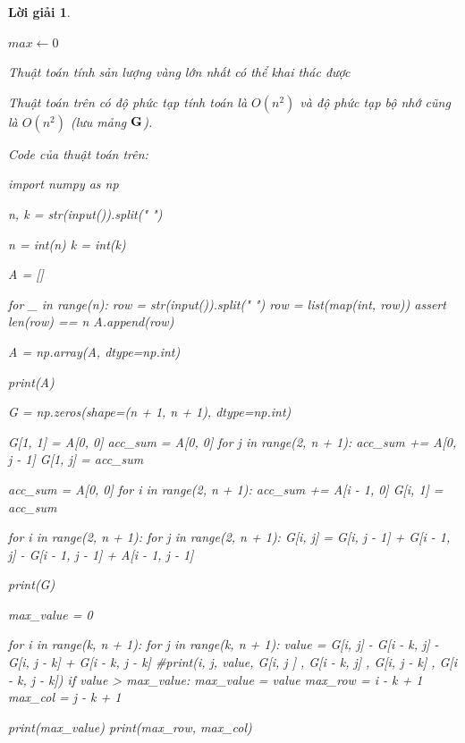 \documentclass[14pt, a4paper]{article}
\theoremstyle{sltheorem}
\theoremstyle{soltheorem}
\newtheorem*{loigiai}{Lời giải}
\begin{document}
\begin{loigiai}
\begin{itemize} [label={$-$}]
\begin{algorithm}[h!]
            $max \gets 0$\;
            \;
            \caption{Thuật toán tính sản lượng vàng lớn nhất có thể khai thác được}
        \end{algorithm}

        Thuật toán trên có độ phức tạp tính toán là $O(n^2)$ và độ phức tạp bộ nhớ cũng là $O(n^2)$ (lưu mảng $\bold{G}$).

        Code của thuật toán trên:

        \begin{python}
import numpy as np

n, k = str(input()).split(" ")
            
n = int(n)
k = int(k)
            
A = []
            
for _ in range(n):
    row = str(input()).split(" ")
    row = list(map(int, row))
    assert len(row) == n
    A.append(row)
            
A = np.array(A, dtype=np.int)
            
print(A)
            
G = np.zeros(shape=(n + 1, n + 1), dtype=np.int)
            
G[1, 1] = A[0, 0]
acc_sum = A[0, 0]
for j in range(2, n + 1):
    acc_sum += A[0, j - 1]
    G[1, j] = acc_sum
            
acc_sum = A[0, 0]
for i in range(2, n + 1):
    acc_sum += A[i - 1, 0]
    G[i, 1] = acc_sum
            
for i in range(2, n + 1):
    for j in range(2, n + 1):
        G[i, j] = G[i, j - 1] + G[i - 1, j] - G[i - 1, j - 1] + A[i - 1, j - 1]
            
            
print(G)
            
max_value = 0
            
for i in range(k, n + 1):
    for j in range(k, n + 1):
        value = G[i, j] - G[i - k, j] - G[i, j - k] + G[i - k, j - k]
        #print(i, j, value, G[i, j ] , G[i - k, j] , G[i, j - k] , G[i - k, j - k])
        if value > max_value:
            max_value = value
            max_row = i - k + 1
            max_col = j - k + 1
            
print(max_value)
print(max_row, max_col)
        \end{python}
    \end{itemize}

    \end{loigiai}
\end{document}
